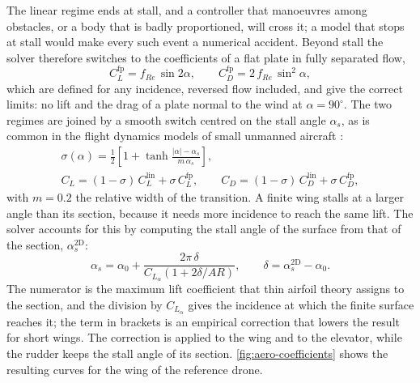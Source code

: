 The linear regime ends at stall, and a controller that manoeuvres among obstacles, or a body that is badly proportioned, will cross it; a model that stops at stall would make every such event a numerical accident. Beyond stall the solver therefore switches to the coefficients of a flat plate in fully separated flow,
\begin{equation}
C_L^{\mathrm{fp}} = f_{\mathit{Re}}\, \sin 2\alpha, \qquad C_D^{\mathrm{fp}} = 2\, f_{\mathit{Re}}\, \sin^2\!\alpha ,
\label{eq:aero-plate}
\end{equation}
which are defined for any incidence, reversed flow included, and give the correct limits: no lift and the drag of a plate normal to the wind at $\alpha = 90^{\circ}$. The two regimes are joined by a smooth switch centred on the stall angle $\alpha_s$, as is common in the flight dynamics models of small unmanned aircraft \cite{beard2012small}:
\begin{equation}
\begin{gathered}
\sigma(\alpha) = \frac{1}{2}\left[ 1 + \tanh\frac{\lvert\alpha\rvert - \alpha_s}{m\,\alpha_s} \right], \\
C_L = (1-\sigma)\, C_L^{\mathrm{lin}} + \sigma\, C_L^{\mathrm{fp}}, \qquad
C_D = (1-\sigma)\, C_D^{\mathrm{lin}} + \sigma\, C_D^{\mathrm{fp}},
\end{gathered}
\label{eq:aero-blend}
\end{equation}
with $m = 0.2$ the relative width of the transition. A finite wing stalls at a larger angle than its section, because it needs more incidence to reach the same lift. The solver accounts for this by computing the stall angle of the surface from that of the section, $\alpha_s^{\mathrm{2D}}$:
\begin{equation}
\alpha_s = \alpha_0 + \frac{2\pi\,\delta}{C_{L_\alpha}\left(1 + 2\delta/\mathit{AR}\right)}, \qquad \delta = \alpha_s^{\mathrm{2D}} - \alpha_0 .
\label{eq:aero-stall}
\end{equation}
The numerator is the maximum lift coefficient that thin airfoil theory assigns to the section, and the division by $C_{L_\alpha}$ gives the incidence at which the finite surface reaches it; the term in brackets is an empirical correction that lowers the result for short wings. The correction is applied to the wing and to the elevator, while the rudder keeps the stall angle of its section. \autoref{fig:aero-coefficients} shows the resulting curves for the wing of the reference drone.

